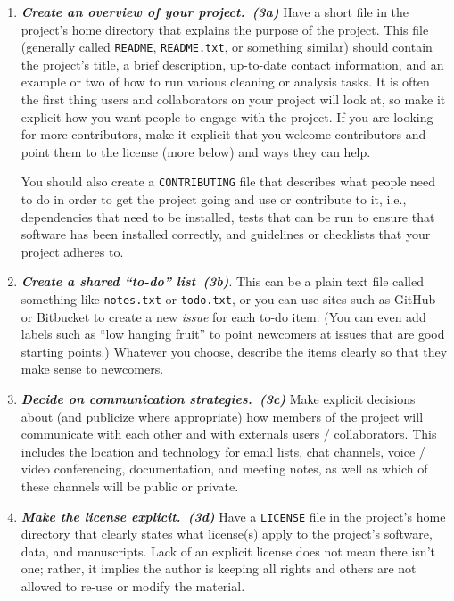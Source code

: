 \documentclass[10pt,letterpaper]{article}
\newcommand{\practice}[2]{\textbf{\emph{{#2}~({#1})}}}
\begin{document}
\begin{enumerate}

\item

  \practice{3a}{Create an overview of your project.}  Have a short
  file in the project's home directory that explains the purpose of
  the project.  This file (generally called \texttt{README},
  \texttt{README.txt}, or something similar) should contain the
  project's title, a brief description, up-to-date contact
  information, and an example or two of how to run various cleaning or
  analysis tasks.  It is often the first thing users and collaborators
  on your project will look at, so make it explicit how you want
  people to engage with the project. If you are looking for more
  contributors, make it explicit that you welcome contributors and
  point them to the license (more below) and ways they can help.

  You should also create a \texttt{CONTRIBUTING} file that describes
  what people need to do in order to get the project going and use or
  contribute to it, i.e., dependencies that need to be installed,
  tests that can be run to ensure that software has been installed
  correctly, and guidelines or checklists that your project adheres
  to.

\item

  \practice{3b}{Create a shared ``to-do'' list}.  This can be a plain
  text file called something like \texttt{notes.txt} or
  \texttt{todo.txt}, or you can use sites such as GitHub or Bitbucket
  to create a new \emph{issue} for each to-do item. (You can even add
  labels such as ``low hanging fruit'' to point newcomers at issues
  that are good starting points.)  Whatever you choose, describe the
  items clearly so that they make sense to newcomers.

\item

  \practice{3c}{Decide on communication strategies.} Make explicit
  decisions about (and publicize where appropriate) how members of the
  project will communicate with each other and with externals users /
  collaborators. This includes the location and technology for email
  lists, chat channels, voice / video conferencing, documentation, and
  meeting notes, as well as which of these channels will be public or
  private.
  
\item

  \practice{3d}{Make the license explicit.}  Have a \texttt{LICENSE}
  file in the project's home directory that clearly states what
  license(s) apply to the project's software, data, and
  manuscripts. Lack of an explicit license does not mean there isn't
  one; rather, it implies the author is keeping all rights and others
  are not allowed to re-use or modify the material.


\end{enumerate}
\end{document}
